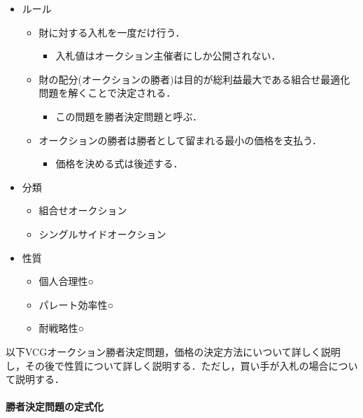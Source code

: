 \begin{itemize}
\tightlist
\item
  ルール

  \begin{itemize}
  \tightlist
  \item
    財に対する入札を一度だけ行う．

    \begin{itemize}
    \tightlist
    \item
      入札値はオークション主催者にしか公開されない．
    \end{itemize}
  \item
    財の配分(オークションの勝者)は目的が総利益最大である組合せ最適化問題を解くことで決定される．

    \begin{itemize}
    \tightlist
    \item
      この問題を勝者決定問題と呼ぶ．
    \end{itemize}
  \item
    オークションの勝者は勝者として留まれる最小の価格を支払う．

    \begin{itemize}
    \tightlist
    \item
      価格を決める式は後述する．
    \end{itemize}
  \end{itemize}
\item
  分類

  \begin{itemize}
  \tightlist
  \item
    組合せオークション
  \item
    シングルサイドオークション
  \end{itemize}
\item
  性質

  \begin{itemize}
  \tightlist
  \item
    個人合理性○
  \item
    パレート効率性○
  \item
    耐戦略性○
  \end{itemize}
\end{itemize}

以下VCGオークション勝者決定問題，価格の決定方法にいついて詳しく説明し，その後で性質について詳しく説明する．ただし，買い手が入札の場合について説明する．

\hypertarget{ux52ddux8005ux6c7aux5b9aux554fux984cux306eux5b9aux5f0fux5316}{%
\paragraph{勝者決定問題の定式化}\label{ux52ddux8005ux6c7aux5b9aux554fux984cux306eux5b9aux5f0fux5316}}


